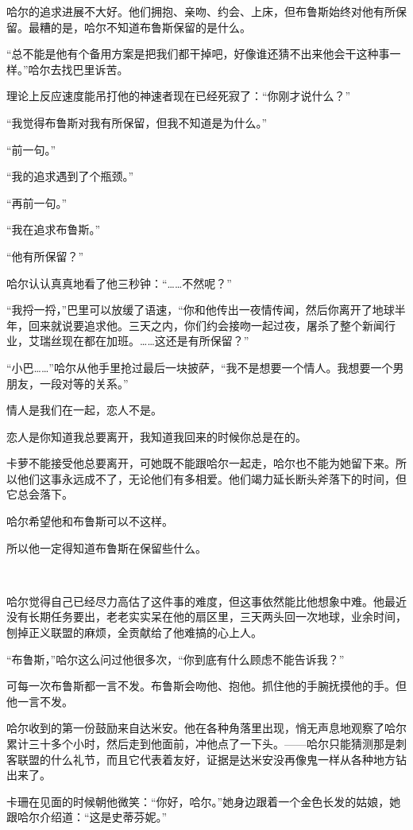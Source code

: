 \documentclass[../main.tex]{subfiles}
\begin{document}
哈尔的追求进展不大好。他们拥抱、亲吻、约会、上床，但布鲁斯始终对他有所保留。最糟的是，哈尔不知道布鲁斯保留的是什么。

“总不能是他有个备用方案是把我们都干掉吧，好像谁还猜不出来他会干这种事一样。”哈尔去找巴里诉苦。

理论上反应速度能吊打他的神速者现在已经死寂了：“你刚才说什么？”

“我觉得布鲁斯对我有所保留，但我不知道是为什么。”

“前一句。”

“我的追求遇到了个瓶颈。”

“再前一句。”

“我在追求布鲁斯。”

“他有所保留？”

哈尔认认真真地看了他三秒钟：“……不然呢？”

“我捋一捋，”巴里可以放缓了语速，“你和他传出一夜情传闻，然后你离开了地球半年，回来就说要追求他。三天之内，你们约会接吻一起过夜，屠杀了整个新闻行业，艾瑞丝现在都在加班。……这还是有所保留？”

“小巴……”哈尔从他手里抢过最后一块披萨，“我不是想要一个情人。我想要一个男朋友，一段对等的关系。”

情人是我们在一起，恋人不是。

恋人是你知道我总要离开，我知道我回来的时候你总是在的。

卡萝不能接受他总要离开，可她既不能跟哈尔一起走，哈尔也不能为她留下来。所以他们这事永远成不了，无论他们有多相爱。他们竭力延长断头斧落下的时间，但它总会落下。

哈尔希望他和布鲁斯可以不这样。

所以他一定得知道布鲁斯在保留些什么。

~\

哈尔觉得自己已经尽力高估了这件事的难度，但这事依然能比他想象中难。他最近没有长期任务要出，老老实实呆在他的扇区里，三天两头回一次地球，业余时间，刨掉正义联盟的麻烦，全贡献给了他难搞的心上人。

“布鲁斯，”哈尔这么问过他很多次，“你到底有什么顾虑不能告诉我？”

可每一次布鲁斯都一言不发。布鲁斯会吻他、抱他。抓住他的手腕抚摸他的手。但他一言不发。

哈尔收到的第一份鼓励来自达米安。他在各种角落里出现，悄无声息地观察了哈尔累计三十多个小时，然后走到他面前，冲他点了一下头。——哈尔只能猜测那是刺客联盟的什么礼节，而且它代表着友好，证据是达米安没再像鬼一样从各种地方钻出来了。

卡珊在见面的时候朝他微笑：“你好，哈尔。”她身边跟着一个金色长发的姑娘，她跟哈尔介绍道：“这是史蒂芬妮。”
\end{document}
